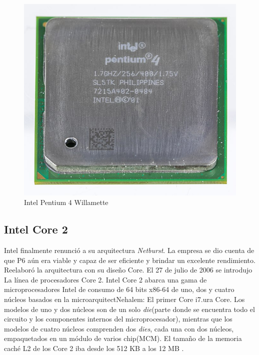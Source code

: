 \begin{figure}[htb]
	\centering
	\includegraphics[scale = 0.15]{Graphics/Pentium_4_-_SL5TK-3056.jpg}
	\caption{Intel Pentium 4 Willamette}
	\label{fig:23}
\end{figure}

\subsection{Intel Core 2}
Intel finalmente renunció a su arquitectura \emph{Netburst}. La empresa se dio cuenta de que P6 aún era viable y capaz de ser eficiente y brindar 
un excelente rendimiento. Reelaboró la arquitectura con su diseño Core. El 27 de julio de 2006 se introdujo La línea de procesadores Core 2.
Intel Core 2 abarca una gama de microprocesadores Intel de consumo de 64 bits x86-64 de uno, dos y cuatro 
núcleos basados en la microarquitectNehalem: El primer Core i7.ura Core. Los modelos de uno y dos núcleos son de un solo \emph{die}(parte donde se encuentra 
todo el circuito y los componentes internos del microprocesador), mientras que los modelos de cuatro núcleos comprenden dos \emph{dies}, cada una con dos núcleos, 
empaquetados en un módulo de varios chip(MCM). El tamaño de la memoria caché  L2 de los Core 2 iba desde los 512 KB a los 
12 MB .

